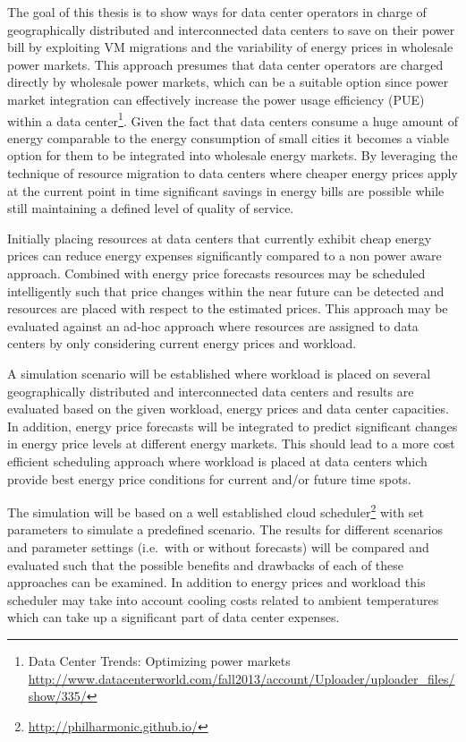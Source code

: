 \documentclass[a4paper]{article}
\begin{document}
The goal of this thesis is to show ways for data center operators in charge of geographically distributed and interconnected data centers to save on their power bill by exploiting VM migrations and the variability of energy prices in wholesale power markets. This approach presumes that data center operators are charged directly by wholesale power markets, which can be a suitable option since power market integration can effectively increase the power usage efficiency (PUE) within a data center\footnote{Data Center Trends: Optimizing power markets \url{http://www.datacenterworld.com/fall2013/account/Uploader/uploader\_files/show/335/}}. Given the fact that data centers consume a huge amount of energy comparable to the energy consumption of small cities\cite{qureshi2009cutting} it becomes a viable option for them to be integrated into wholesale energy markets. By leveraging the technique of resource migration to data centers where cheaper energy prices apply at the current point in time significant savings in energy bills are possible while still maintaining a defined level of quality of service. 

Initially placing resources at data centers that currently exhibit cheap energy prices can reduce energy expenses significantly compared to a non power aware approach. Combined with energy price forecasts resources may be scheduled intelligently such that price changes within the near future can be detected and resources are placed with respect to the estimated prices. This approach may be evaluated against an ad-hoc approach where resources are assigned to data centers by only considering current energy prices and workload. 

A simulation scenario will be established where workload is placed on several geographically distributed and interconnected data centers and results are evaluated based on the given workload, energy prices and data center capacities. In addition, energy price forecasts will be integrated to predict significant changes in energy price levels at different energy markets. This should lead to a more cost efficient scheduling approach where workload is placed at data centers which provide best energy price conditions for current and/or future time spots. 

The simulation will be based on a well established cloud scheduler\footnote{\url{http://philharmonic.github.io/}} with set parameters to simulate a predefined scenario. The results for different scenarios and parameter settings (i.e.~with or without forecasts) will be compared and evaluated such that the possible benefits and drawbacks of each of these approaches can be examined. 
In addition to energy prices and workload this scheduler may take into account cooling costs related to ambient temperatures which can take up a significant part of data center expenses. 
\end{document}
